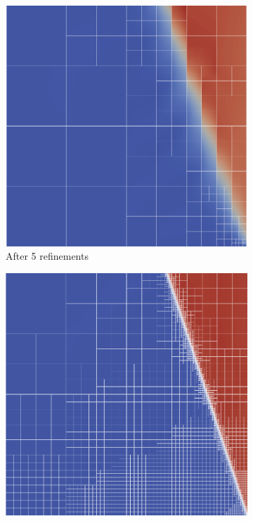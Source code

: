 \documentclass[Dissertation.tex]{subfiles}
\begin{document}
\begin{figure}[!ht]
\begin{subfigure}[t]{0.32\textwidth}
\includegraphics[width=\textwidth]{Dissertation/Noh/Robust-mesh5.png}
\caption{After 5 refinements}
\end{subfigure}
\begin{subfigure}[t]{0.32\textwidth}
\centering
\includegraphics[width=\textwidth]{Dissertation/Noh/Robust-mesh10.png}

\end{subfigure}
\end{figure}
\end{document}
